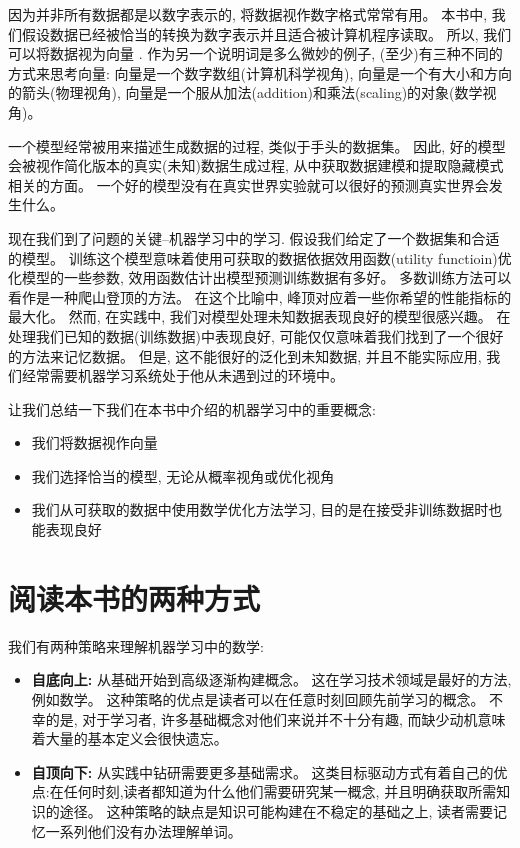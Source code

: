 因为并非所有数据都是以数字表示的, 将数据视作数字格式常常有用。
本书中, 我们假设数据已经被恰当的转换为数字表示并且适合被计算机程序读取。
所以, 我们可以将数据视为向量 .
作为另一个说明词是多么微妙的例子, (至少)有三种不同的方式来思考向量:
向量是一个数字数组(计算机科学视角),
向量是一个有大小和方向的箭头(物理视角),
向量是一个服从加法(addition)和乘法(scaling)的对象(数学视角)。

一个模型经常被用来描述生成数据的过程, 类似于手头的数据集。
因此, 好的模型会被视作简化版本的真实(未知)数据生成过程, 从中获取数据建模和提取隐藏模式相关的方面。
一个好的模型没有在真实世界实验就可以很好的预测真实世界会发生什么。

现在我们到了问题的关键--机器学习中的学习.
假设我们给定了一个数据集和合适的模型。
训练这个模型意味着使用可获取的数据依据效用函数(utility functioin)优化模型的一些参数,
效用函数估计出模型预测训练数据有多好。
多数训练方法可以看作是一种爬山登顶的方法。
在这个比喻中, 峰顶对应着一些你希望的性能指标的最大化。
然而, 在实践中, 我们对模型处理未知数据表现良好的模型很感兴趣。
在处理我们已知的数据(训练数据)中表现良好, 可能仅仅意味着我们找到了一个很好的方法来记忆数据。
但是, 这不能很好的泛化到未知数据, 并且不能实际应用, 我们经常需要机器学习系统处于他从未遇到过的环境中。

让我们总结一下我们在本书中介绍的机器学习中的重要概念:

\begin{itemize}
	\item 我们将数据视作向量
	\item 我们选择恰当的模型, 无论从概率视角或优化视角
	\item 我们从可获取的数据中使用数学优化方法学习, 目的是在接受非训练数据时也能表现良好
\end{itemize}

\section{阅读本书的两种方式}

我们有两种策略来理解机器学习中的数学:

\begin{itemize}
	\item \textbf{自底向上:}
	从基础开始到高级逐渐构建概念。 这在学习技术领域是最好的方法, 例如数学。
	这种策略的优点是读者可以在任意时刻回顾先前学习的概念。
	不幸的是, 对于学习者, 许多基础概念对他们来说并不十分有趣, 而缺少动机意味着大量的基本定义会很快遗忘。
	\item \textbf{自顶向下:}
	从实践中钻研需要更多基础需求。
	这类目标驱动方式有着自己的优点:在任何时刻,读者都知道为什么他们需要研究某一概念, 并且明确获取所需知识的途径。
	这种策略的缺点是知识可能构建在不稳定的基础之上, 读者需要记忆一系列他们没有办法理解单词。
\end{itemize}


